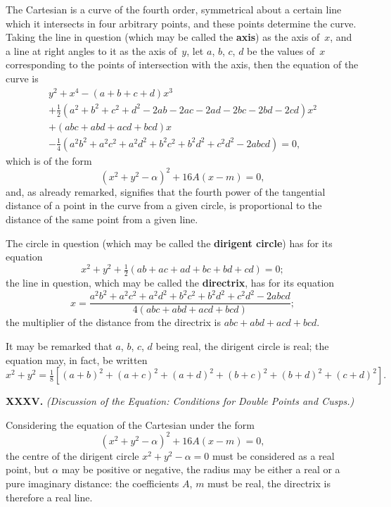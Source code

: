 \documentclass[11pt,a4paper]{book}
\begin{document}
\begin{center}
The Cartesian is a curve of the fourth order, symmetrical
about a certain line which it intersects in four arbitrary points,
and these points determine the curve.
Taking the line in question (which may be called the \textbf{axis})
as the axis of~$x$, and a line at right angles to it as the axis of~$y$,
let $a$, $b$, $c$, $d$ be the values of~$x$ corresponding to the points
of intersection with the axis, then the equation of the curve is
\begin{multline*}
y^{2} + x^{4} - (a + b + c + d)x^{3} \\
+ \tfrac{1}{2}(a^{2} + b^{2} + c^{2} + d^{2} - 2ab - 2ac - 2ad - 2bc - 2bd - 2cd)x^{2} \\
+ (abc + abd + acd + bcd)x \\
- \tfrac{1}{4}(a^{2}b^{2} + a^{2}c^{2} + a^{2}d^{2} + b^{2}c^{2} + b^{2}d^{2} + c^{2}d^{2}
- 2abcd) = 0,
\end{multline*}
which is of the form
\[
(x^{2} + y^{2} - \alpha)^{2} + 16A(x - m) = 0,
\]
and, as already remarked, signifies that the fourth power of
the tangential distance of a point in the curve from a given circle,
is proportional to the distance of the same point from a given line.

The circle in question (which may be called the \textbf{dirigent circle})
has for its equation
\[
x^{2} + y^{2} + \tfrac{1}{2}(ab + ac + ad + bc + bd + cd) = 0;
\]
the line in question, which may be called the \textbf{directrix}, has for its
equation
\[
x = \frac{a^{2}b^{2} + a^{2}c^{2} + a^{2}d^{2} + b^{2}c^{2} + b^{2}d^{2} + c^{2}d^{2} - 2abcd}
{4(abc + abd + acd + bcd)};
\]
the multiplier of the distance from the directrix is
$abc + abd + acd + bcd$.

It may be remarked that $a$, $b$, $c$, $d$ being real, the dirigent
circle is real; the equation may, in fact, be written
\[
x^{2} + y^{2} = \tfrac{1}{8} [ (a + b)^{2} + (a + c)^{2} + (a + d)^{2}
+ (b + c)^{2} + (b + d)^{2} + (c + d)^{2} ].
\]

\medskip\noindent\textbf{XXXV.}
\textit{(Discussion of the Equation: Conditions for Double Points and Cusps.)}

Considering the equation of the Cartesian under the form
\[
(x^{2} + y^{2} - \alpha)^{2} + 16A(x - m) = 0,
\]
the centre of the dirigent circle $x^{2} + y^{2} - \alpha = 0$ must
be considered as a real point, but $\alpha$ may be positive or negative,
\ie{} the radius may be either a real or a pure imaginary distance:
the coefficients $A$, $m$ must be real, the directrix is therefore
a real line.


\end{center}
\end{document}
